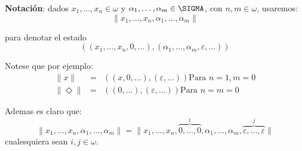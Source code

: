 \begin{frame}
	\textbf{Notación}: dados $x_{1}, \dotsc, x_{n} \in \omega$ y $\alpha_{1}, \dotsc,\alpha_{m} \in \SIGMA$, con $n, m \in
	\omega $, usaremos:
	\begin{equation*}
		\lVert x_{1}, \dotsc, x_{n}, \alpha_{1}, \dotsc, \alpha_{m} \rVert
	\end{equation*}

	\PN para denotar el estado
	\begin{equation*}
		\left((x_{1}, \dotsc, x_{n}, 0, \dotsc), (\alpha_{1}, \dotsc, \alpha_{m}, \varepsilon, \dotsc)\right)
	\end{equation*}

	\PN Notese que por ejemplo:
	\begin{eqnarray*}
	\lVert x \rVert &=& \left((x, 0, \dotsc), (\varepsilon, \dotsc)\right) \text{Para } n = 1, m = 0 \\
	\lVert \Diamond \rVert &=& \left((0, \dotsc), (\varepsilon, \dotsc)\right) \text{Para } n = m = 0
	\end{eqnarray*}

	\PN Ademas es claro que:
	\[
		\lVert x_{1}, \dotsc, x_{n}, \alpha_{1}, \dotsc, \alpha_{m} \rVert = \lVert x_{1}, \dotsc, x_{n},
		\overset{i}{\overbrace{0, \dotsc, 0}}, \alpha_{1}, \dotsc, \alpha_{m}, \overset{j}{\overbrace{\varepsilon, \dotsc,
		\varepsilon}} \rVert
	\]
	cualesquiera sean $i, j \in \omega$.
\end{frame}

